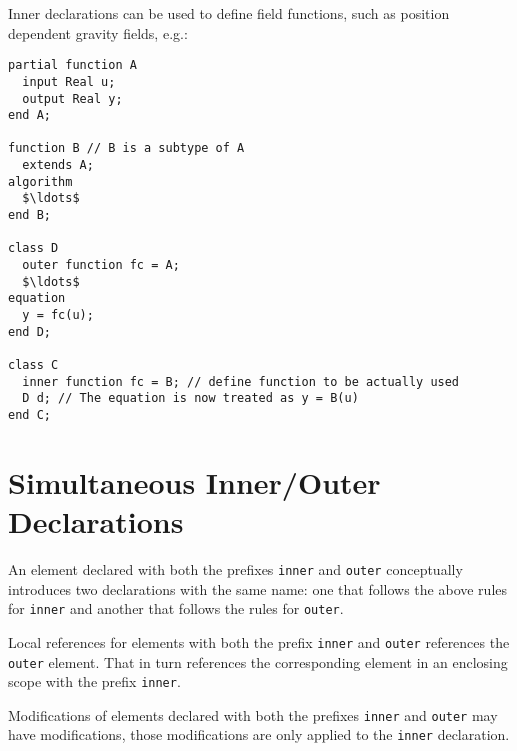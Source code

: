 \begin{nonnormative}
Inner declarations can be used to define field functions, such as position dependent gravity fields, e.g.:
\begin{lstlisting}[language=modelica]
partial function A
  input Real u;
  output Real y;
end A;

function B // B is a subtype of A
  extends A;
algorithm
  $\ldots$
end B;

class D
  outer function fc = A;
  $\ldots$
equation
  y = fc(u);
end D;

class C
  inner function fc = B; // define function to be actually used
  D d; // The equation is now treated as y = B(u)
end C;
\end{lstlisting}
\end{nonnormative}


\section{Simultaneous Inner/Outer Declarations}\label{simultaneous-inner-outer-declarations}

An element declared with both the prefixes \lstinline!inner! and \lstinline!outer! conceptually introduces two declarations with the same name: one that follows the above rules for \lstinline!inner! and another that follows the rules for \lstinline!outer!.

\begin{nonnormative}
Local references for elements with both the prefix \lstinline!inner! and \lstinline!outer! references the \lstinline!outer! element.
That in turn references the corresponding element in an enclosing scope with the prefix \lstinline!inner!.
\end{nonnormative}

Modifications of elements declared with both the prefixes \lstinline!inner! and \lstinline!outer! may have modifications, those modifications are only applied to the \lstinline!inner! declaration.

